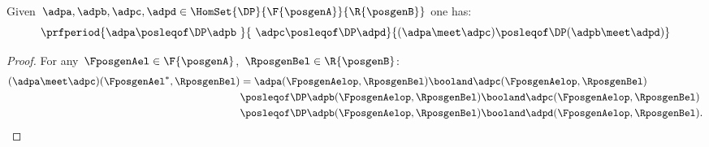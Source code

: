\begin{lemma}
    \label{lem:intersection_mon}
    Given~$\adpa,\adpb,\adpc,\adpd \in \HomSet{\DP}{\F{\posgenA}}{\R{\posgenB}}$ one has:
    \begin{equation*}
        \prfperiod{\adpa\posleqof\DP \adpb\ }{\ \adpc\posleqof\DP \adpd}{(\adpa\meet \adpc)\posleqof\DP (\adpb\meet \adpd)}
    \end{equation*}
\end{lemma}
\begin{proof}
    For any~$\FposgenAel\in \F{\posgenA}$,~$\RposgenBel\in \R{\posgenB}$:
    \begin{equation*}
        \begin{aligned}
            (\adpa \meet \adpc)(\FposgenAel^*,\RposgenBel)
             & =\adpa(\FposgenAelop,\RposgenBel)\booland \adpc(\FposgenAelop,\RposgenBel)              \\
             & \posleqof\DP \adpb(\FposgenAelop,\RposgenBel)\booland \adpc(\FposgenAelop,\RposgenBel)  \\
             & \posleqof\DP \adpb(\FposgenAelop,\RposgenBel)\booland \adpd(\FposgenAelop,\RposgenBel).
        \end{aligned}
    \end{equation*}
\end{proof}
